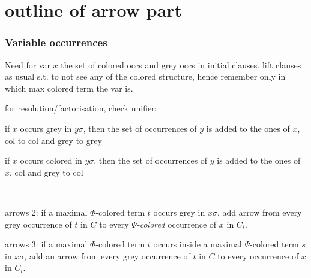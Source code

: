 \documentclass[,%
	draft=false,%
	numbers=noendperiod
	11pt,
	a4paper,
	oneside,%
	openany,
]{memoir}
\begin{document}
\label{sec:arrow_quantifier_block}

\chapter{outline of arrow part}


\subsection{Variable occurrences}
Need for var $x$ the set of colored occs and grey occs in initial clauses.
lift clauses as usual s.t. to not see any of the colored structure, hence remember only in which max colored term the var is.

for resolution/factorisation, check unifier:
\begin{compactitem}
\item
	if $x$ occurs grey in $y\sigma$, then the set of occurrences of $y$ is added to the ones of $x$, col to col and grey to grey
\item
	if $x$ occurs colored in $y\sigma$, then the set of occurrences of $y$ is added to the ones of $x$, col and grey to col
\end{compactitem}


\begin{defi}~


	arrows 2: if a maximal $\Phi$-colored term $t$ occurs grey in $x\sigma$, add arrow from every grey occurrence of $t$ in $C$ to every \emph{$\Psi$-colored} occurrence of $x$ in $C_i$.

	arrows 3: if a maximal $\Phi$-colored term $t$ occurs inside a maximal $\Psi$-colored term $s$ in $x\sigma$, add an arrow from every grey occurrence of $t$ in $C$ to every occurrence of $x$ in $C_i$.
\end{defi}
\end{document}
